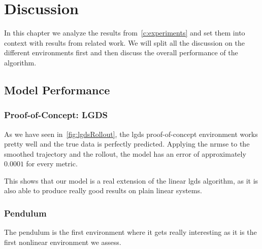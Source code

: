 \chapter{Discussion}
\label{c:discussion}



In this chapter we analyze the results from~\autoref{c:experiments} and set them into context with results from related work. We will split all the discussion on the different environments first and then discuss the overall performance of the \algname algorithm.

\section{Model Performance}

	\subsection{Proof-of-Concept: LGDS}
		As we have seen in~\autoref{fig:lgdsRollout}, the \ac{lgds} proof-of-concept environment works pretty well and the true data is perfectly predicted. Applying the \ac{nrmse} to the smoothed trajectory and the rollout, the model has an error of approximately \( 0.0001 \) for every metric.

		This shows that our model is a real extension of the linear \ac{lgds} algorithm, as it is also able to produce really good results on plain linear systems.

	\subsection{Pendulum}
		The pendulum is the first environment where it gets really interesting as it is the first nonlinear environment we assess.

